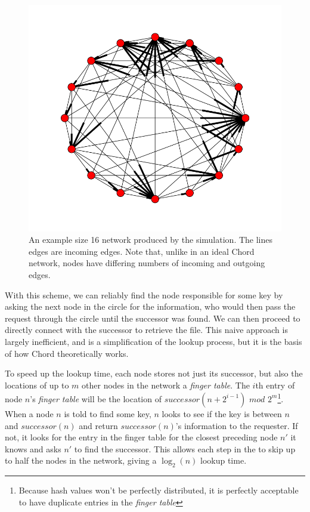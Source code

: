\documentclass[12pt]{ieeetran} %
\begin{document}
\begin{figure}
\includegraphics[width=\linewidth]{chordreal}
\caption{An example size 16 network produced by the simulation.  The lines edges are incoming edges.  Note that, unlike in an ideal Chord network, nodes have differing numbers of incoming and outgoing edges.}
\label{chordreal}
\end{figure}


With this scheme, we can reliably find the node responsible for some key by asking the next node in the circle for the information, who would then pass the request through the circle until the successor was found.  We can then proceed to directly connect with the successor to retrieve the file.  This naive approach is largely inefficient, and is a simplification of the lookup process, but it is the basis of how Chord theoretically works.

To speed up the lookup time, each node stores not just its successor, but also the locations of up to $m$ other nodes in the network a \emph{finger table}.  The $i$th entry of node $n$'s \emph{finger table} will be the location of $successor(n+2^{i-1})$ $mod$ $2^m$\footnote{Because hash values won't be perfectly distributed, it is perfectly acceptable to have duplicate entries in the \emph{finger table}}. When a node $n$ is told to find some key, $n$ looks to see if the key is between $n$ and $successor(n)$ and return $successor(n)$'s information to the requester. If not, it looks for the entry in the finger table for the closest preceding node $n'$ it knows and asks $n'$ to find the successor.  This allows each step in the to skip up to half the nodes in the network, giving a $\log_2(n)$ lookup time.   %
\end{document}
